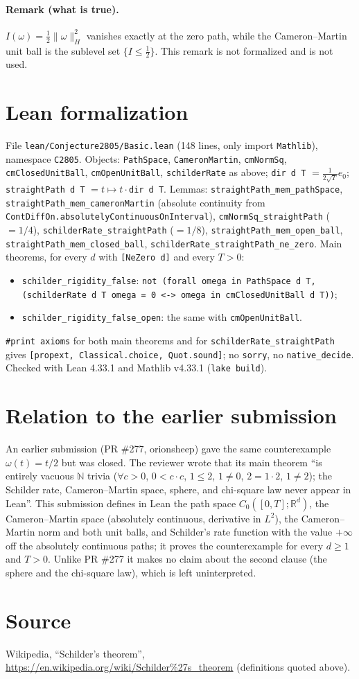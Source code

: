 \documentclass[11pt]{article}
\theoremstyle{definition}
\begin{document}
\paragraph{Remark (what is true).} $I(\omega)=\frac12\|\omega\|_H^2$ vanishes exactly at the zero
path, while the Cameron--Martin unit ball is the sublevel set $\{I\le\frac12\}$. This remark is not
formalized and is not used.

\section{Lean formalization}
File \texttt{lean/Conjecture2805/Basic.lean} (148 lines, only import \texttt{Mathlib}), namespace
\texttt{C2805}. Objects: \texttt{PathSpace}, \texttt{CameronMartin}, \texttt{cmNormSq},
\texttt{cmClosedUnitBall}, \texttt{cmOpenUnitBall}, \texttt{schilderRate} as above;
\texttt{dir d T} $=\frac{1}{2\sqrt T}e_0$; \texttt{straightPath d T} $=t\mapsto t\cdot$\texttt{dir d T}.
Lemmas: \texttt{straightPath\_mem\_pathSpace}, \texttt{straightPath\_mem\_cameronMartin}
(absolute continuity from \texttt{ContDiffOn.absolutelyContinuousOnInterval}),
\texttt{cmNormSq\_straightPath} ($=1/4$), \texttt{schilderRate\_straightPath} ($=1/8$),
\texttt{straightPath\_mem\_open\_ball}, \texttt{straightPath\_mem\_closed\_ball},
\texttt{schilderRate\_straightPath\_ne\_zero}. Main theorems, for every $d$ with
\texttt{[NeZero d]} and every $T>0$:
\begin{itemize}
\item \texttt{schilder\_rigidity\_false}: \texttt{not (forall omega in PathSpace d T,
  (schilderRate d T omega = 0 <-> omega in cmClosedUnitBall d T))};
\item \texttt{schilder\_rigidity\_false\_open}: the same with \texttt{cmOpenUnitBall}.
\end{itemize}
\texttt{\#print axioms} for both main theorems and for \texttt{schilderRate\_straightPath} gives
\texttt{[propext, Classical.choice, Quot.sound]}; no \texttt{sorry}, no \texttt{native\_decide}.
Checked with Lean 4.33.1 and Mathlib v4.33.1 (\texttt{lake build}).

\section{Relation to the earlier submission}
An earlier submission (PR \#277, orionsheep) gave the same counterexample $\omega(t)=t/2$ but was
closed. The reviewer wrote that its main theorem ``is entirely vacuous $\mathbb N$ trivia
($\forall c>0$, $0<c\cdot c$, $1\le2$, $1\ne0$, $2=1\cdot2$, $1\ne2$); the Schilder rate,
Cameron--Martin space, sphere, and chi-square law never appear in Lean''. This submission defines
in Lean the path space $C_0([0,T];\mathbb R^d)$, the Cameron--Martin space (absolutely continuous,
derivative in $L^2$), the Cameron--Martin norm and both unit balls, and Schilder's rate function
with the value $+\infty$ off the absolutely continuous paths; it proves the counterexample for
every $d\ge1$ and $T>0$. Unlike PR \#277 it makes no claim about the second clause (the sphere and
the chi-square law), which is left uninterpreted.

\section*{Source}
Wikipedia, ``Schilder's theorem'', \url{https://en.wikipedia.org/wiki/Schilder%27s_theorem}
(definitions quoted above).
\end{document}
